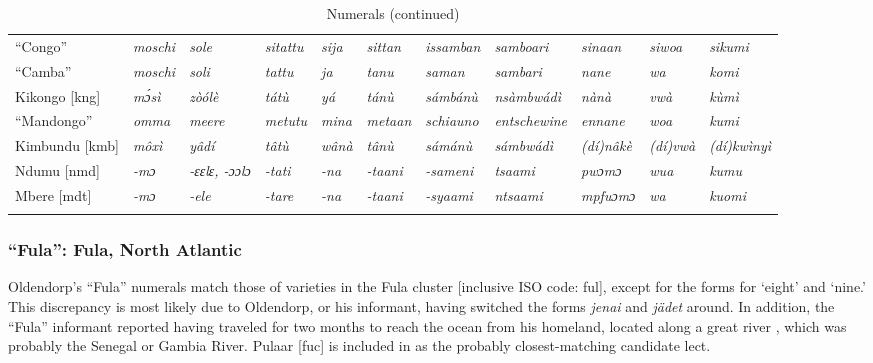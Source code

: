 \documentclass[output=paper,colorlinks,citecolor=brown]{langscibook}
\begin{document}
\begin{sidewaystable}
{\begin{tabular}{p{3cm}llllllllll}
    ``Congo'' & \textit{moschi} & \textit{sole} & \textit{sitattu} & \textit{sija} & \textit{sittan} & \textit{issamban} & \textit{samboari} & \textit{sinaan} & \textit{siwoa} & \textit{sikumi} \\
    ``Camba'' & \textit{moschi} & \textit{soli} & \textit{tattu} & \textit{ja} & \textit{tanu} & \textit{saman} & \textit{sambari} & \textit{nane} & \textit{wa} & \textit{komi} \\
    Kikongo {[}kng{]} & \textit{mɔ́sì} & \textit{zòólè} & \textit{tátù} & \textit{yá} & \textit{tánù} & \textit{sámbánù} & \textit{nsàmbwádì} & \textit{nànà} & \textit{vwà} & \textit{kùmì} \\
    ``Mandongo'' & \textit{omma} & \textit{meere} & \textit{metutu} & \textit{mina} & \textit{metaan} & \textit{schiauno} & \textit{entschewine} & \textit{ennane} & \textit{woa} & \textit{kumi} \\
    Kimbundu {[}kmb{]} & \textit{môxì} & \textit{yâdí} & \textit{tâtù} & \textit{wânà} & \textit{tânù} & \textit{sámánù} & \textit{sámbwádì} & \textit{(dí)nâkè} & \textit{(dí)vwà} & \textit{(dí)kwìnyì} \\
    Ndumu {[}nmd{]} & \textit{-mɔ} & \textit{-ɛɛlɛ, -ɔɔlɔ} & \textit{-tati} & \textit{-na} & \textit{-taani} & \textit{-sameni} & \textit{tsaami} & \textit{pwɔmɔ} & \textit{wua} & \textit{kumu} \\
    Mbere {[}mdt{]} & \textit{-mɔ} & \textit{-ele} & \textit{-tare} & \textit{-na} & \textit{-taani} & \textit{-syaami} & \textit{ntsaami} & \textit{mpfuɔmɔ} & \textit{wa} & \textit{kuomi} \\ \lspbottomrule
\end{tabular}
}
\caption{Numerals (continued)}
\label{}
\end{sidewaystable}



\subsubsection{``Fula'': Fula, North Atlantic}

Oldendorp’s ``Fula'' numerals match those of varieties in the Fula cluster [inclusive ISO code: ful], except for the forms for ‘eight’ and `nine.' This discrepancy is most likely due to Oldendorp, or his informant, having switched the forms \emph{jenai} and \emph{j\"adet} around. In addition, the ``Fula'' informant reported having traveled for two months to reach the ocean from his homeland, located along a great river \citep[373]{Oldendorp_2000}, which was probably the Senegal or Gambia River. Pulaar [fuc] is included in  as the probably closest-matching candidate lect.
\end{document}
